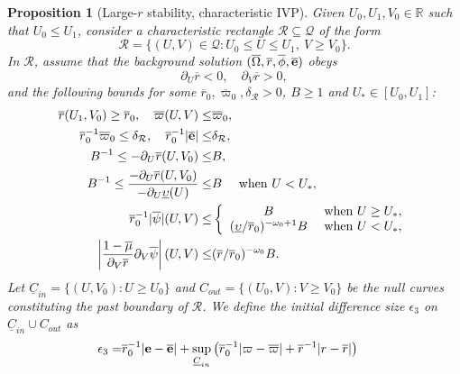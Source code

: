\documentclass[10pt, reqno]{amsart}
\newtheorem{proposition}[theorem]{Proposition}
\theoremstyle{definition}
\theoremstyle{remark}
\theoremstyle{conjecture}
\numberwithin{equation}{section}
\newcommand{\abs}[1]{\vert#1\vert}
\newcommand{\set}[1]{\{#1\}}
\newcommand{\rd}{\partial}
\newcommand{\0}{\emptyset}
\newcommand{\dlt}{\delta}
\newcommand{\eps}{\epsilon}
\newcommand{\omg}{\omega}
\newcommand{\Omg}{\Omega}
\newcommand{\ups}{\upsilon}
\newcommand{\bfe}{{\bf e}}
\newcommand{\bbR}{\mathbb R}
\newcommand{\calQ}{\mathcal Q}
\newcommand{\calR}{\mathcal R}
\newcommand{\PD}{\calQ}
\newcommand{\uC}{\underline{C}}
\newcommand{\e}{\bfe}							%
\newcommand{\Omgbg}{\overline{\Omg}}				%
\newcommand{\phibg}{\overline{\phi}}				%
\newcommand{\psibg}{\overline{\psi}}				%
\newcommand{\rbg}{\overline{r}}					%
\newcommand{\varpibg}{\overline{\varpi}}				%
\newcommand{\mubg}{\overline{\mu}}				%
\newcommand{\ebg}{\overline{\e}}					%
\newcommand{\Abs}[1]{\left\vert #1 \right\vert}
\begin{document}
\begin{proposition}[Large-$r$ stability, characteristic IVP] \label{prop:extr-st}
Given $U_{0}, U_{1}, V_{0} \in \bbR$ such that $U_{0} \leq U_{1}$, consider a characteristic rectangle $\calR \subseteq \PD$ of the form 
\begin{equation*}
	\calR = \set{(U, V) \in \PD : U_{0} \leq U \leq U_{1}, \ V \geq V_{0}}.
\end{equation*}
In $\calR$, assume that the background solution $(\Omgbg, \rbg, \phibg, \ebg)$ obeys 
\begin{equation*}
	\rd_{U} \rbg < 0, \quad \rd_{V} \rbg > 0,
\end{equation*}
and the following bounds for some $\rbg_{0}, \varpibg_{0}, \dlt_{\calR} > 0$, $B \geq 1$ and $U_{\ast} \in [U_{0}, U_{1}]$:
\begin{align}
	\rbg(U_{1}, V_{0}) \geq \rbg_{0}, \quad 
	\varpibg(U,V) \leq & \varpibg_{0}, \label{eq:extr-st:hyp:r-m} \\
	\rbg_{0}^{-1} \varpibg_{0} \leq \dlt_{\calR}, \quad
	\rbg_{0}^{-1} \abs{\ebg} \leq & \dlt_{\calR}, \label{eq:extr-st:hyp:m-e} \\
	B^{-1} \leq -\rd_{U} \rbg (U, V_{0}) \leq & B, \label{eq:extr-st:hyp:dur} \\
	B^{-1} \leq \frac{-\rd_{U} \rbg (U, V_{0})}{- \rd_{U} \underline{\ups}(U)} \leq & B \quad \hbox{ when } U < U_{\ast}, \label{eq:extr-st:hyp:duups} \\
	\rbg_{0}^{-1} \abs{\psibg}(U,V) \leq & \left\{
	\begin{array}{cl}
	B & \hbox{ when } U \geq U_{\ast} , \\
	(\underline{\ups} / \rbg_{0})^{-\omg_0+1}  B & \hbox{ when } U < U_{\ast}, \\
	\end{array} \right. \label{eq:extr-st:hyp:psi} \\
	\Abs{\frac{1-\mubg}{\rd_{V} \rbg} \rd_{V} \psibg}(U,V) \leq & (\rbg / \rbg_{0})^{-\omg_0}  B. \label{eq:extr-st:hyp:dvpsi}
\end{align}
Let $\uC_{in} = \set{(U, V_{0}) : U \geq U_{0}}$ and $C_{out} = \set{(U_{0}, V) : V \geq V_{0}}$ be the null curves constituting the past boundary of $\calR$. We define the initial difference size $\eps_{3}$ on $\uC_{in} \cup C_{out}$ as
\begin{align*}
	\eps_{3} =
	& \rbg_{0}^{-1} \abs{\e - \ebg}  + \sup_{\uC_{in}} \left(
	\rbg_{0}^{-1} \abs{\varpi - \varpibg}
	+ \rbg^{-1} \abs{r - \rbg} \right) 

\end{align*}
\end{proposition}
\end{document}
